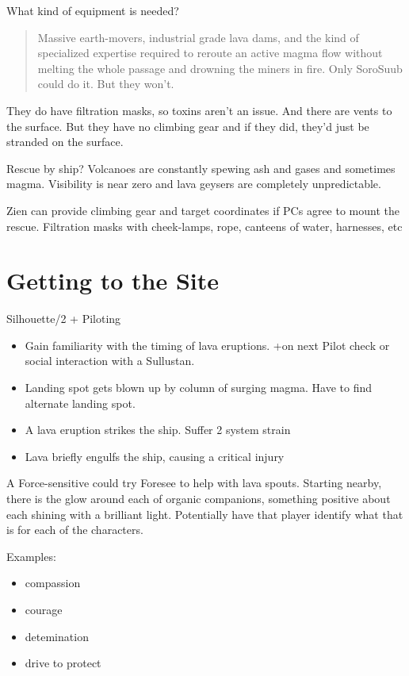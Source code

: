 \documentclass[background]{book}
\newcommand{\stb}{\SetbackDie}
\begin{document}
\begin{multicols}{2}
What kind of equipment is needed? \\
\begin{quote}
Massive earth-movers, industrial grade lava dams, and the kind of specialized expertise required to reroute an active magma flow without melting the whole passage and drowning the miners in fire. Only SoroSuub could do it. But they won’t.
\end{quote}

They do have filtration masks, so toxins aren’t an issue. And there are vents to the surface. But they have no climbing gear and if they did, they’d just be stranded on the surface.


Rescue by ship? Volcanoes are constantly spewing ash and gases and sometimes magma. Visibility is near zero and lava geysers are completely unpredictable. 


Zien can provide climbing gear and target coordinates if PCs agree to mount the rescue. Filtration masks with cheek-lamps, rope, canteens of water, harnesses, etc

\section{Getting to the Site}

Silhouette/2 + \stb\stb\stb Piloting

\begin{itemize}
	\item \advantage Gain familiarity with the timing of lava eruptions.  +\boost on next Pilot check or social interaction with a Sullustan.
	\item \failure Landing spot gets blown up by column of surging magma. Have to find alternate landing spot.
	\item \threat \threat A lava eruption strikes the ship.  Suffer 2 system strain
	\item \despair Lava briefly engulfs the ship, causing a critical injury
\end{itemize}

A Force-sensitive could try Foresee to help with lava spouts. Starting nearby, there is the glow around each of organic companions, something positive about each shining with a brilliant light. Potentially have that player identify what that is for each of the characters.

Examples:
\begin{itemize}
    \item compassion
    \item courage
    \item detemination
    \item drive to protect
\end{itemize}


\end{multicols}
\end{document}
